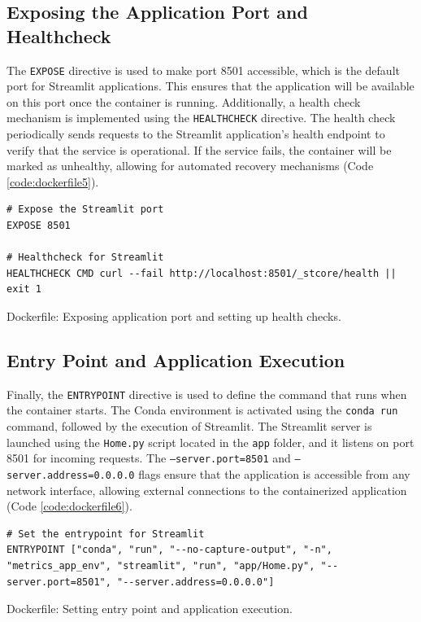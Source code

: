 \subsection{Exposing the Application Port and Healthcheck}

The \texttt{EXPOSE} directive is used to make port 8501 accessible, which is the default port for Streamlit applications. This ensures that the application will be available on this port once the container is running. Additionally, a health check mechanism is implemented using the \texttt{HEALTHCHECK} directive. The health check periodically sends requests to the Streamlit application's health endpoint to verify that the service is operational. If the service fails, the container will be marked as unhealthy, allowing for automated recovery mechanisms (Code \ref{code:dockerfile5}).

\begin{longlisting}
\begin{verbatim}
# Expose the Streamlit port
EXPOSE 8501

# Healthcheck for Streamlit
HEALTHCHECK CMD curl --fail http://localhost:8501/_stcore/health || exit 1
\end{verbatim}
\caption{Dockerfile: Exposing application port and setting up health checks.}
\label{code:dockerfile5}
\end{longlisting}

\subsection{Entry Point and Application Execution}

Finally, the \texttt{ENTRYPOINT} directive is used to define the command that runs when the container starts. The Conda environment is activated using the \texttt{conda run} command, followed by the execution of Streamlit. The Streamlit server is launched using the \texttt{Home.py} script located in the \texttt{app} folder, and it listens on port 8501 for incoming requests. The \texttt{--server.port=8501} and \texttt{--server.address=0.0.0.0} flags ensure that the application is accessible from any network interface, allowing external connections to the containerized application (Code \ref{code:dockerfile6}).

\begin{longlisting}
\begin{verbatim}
# Set the entrypoint for Streamlit
ENTRYPOINT ["conda", "run", "--no-capture-output", "-n", "metrics_app_env", "streamlit", "run", "app/Home.py", "--server.port=8501", "--server.address=0.0.0.0"]
\end{verbatim}
\caption{Dockerfile: Setting entry point and application execution.}
\label{code:dockerfile6}
\end{longlisting}



